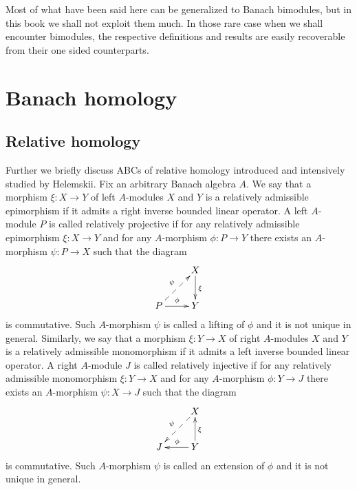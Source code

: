 Most of what have been said here can be generalized to Banach bimodules, but in
this book we shall not exploit them much. In those rare case when we shall
encounter bimodules, the respective definitions and results are easily
recoverable from their one sided counterparts.


\section{Banach homology}\label{SectionBanachHomology}


\subsection{Relative homology}\label{SubSectionRelativeHomology}

Further we briefly discuss ABCs of relative homology introduced and intensively
studied by Helemskii. Fix an arbitrary Banach algebra $A$. We say that a
morphism $\xi:X\to Y$ of left $A$-modules $X$ and $Y$ is a relatively admissible
epimorphism if it admits a right inverse bounded linear operator. A left
$A$-module $P$ is called relatively projective if for any relatively admissible
epimorphism $\xi:X\to Y$ and for any $A$-morphism $\phi:P\to Y$ there exists an
$A$-morphism $\psi:P\to X$ such that the diagram
$$
\xymatrix{
& {X} \ar[d]^{\xi}\\  %
{P} \ar@{-->}[ur]^{\psi} \ar[r]^{\phi} &{Y}}  %
$$
is commutative. Such $A$-morphism $\psi$ is called a lifting of $\phi$ and it is
not unique in general. Similarly,  we say that a morphism $\xi:Y\to X$ of right
$A$-modules $X$ and $Y$ is a relatively admissible monomorphism if it admits a
left inverse bounded linear operator. A right $A$-module $J$ is called
relatively injective if for any relatively admissible  monomorphism $\xi:Y\to X$
and for any $A$-morphism $\phi:Y\to J$ there exists an $A$-morphism 
$\psi:X\to J$ such that the diagram
$$
\xymatrix{
& {X} \ar@{-->}[dl]_{\psi} \\  %
{J} &{Y} \ar[l]_{\phi} \ar[u]_{\xi}}  %
$$
is commutative. Such $A$-morphism $\psi$ is called an extension of $\phi$ and it
is not unique in general.

